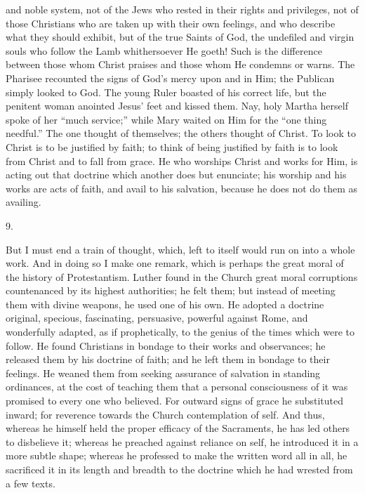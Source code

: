 and noble system, not of the Jews who rested in their rights and
privileges, not of those Christians who are taken up with their own
feelings, and who describe what they should exhibit, but of the true
Saints of God, the undefiled and virgin souls who follow the Lamb
whithersoever He goeth! Such is the difference between those whom
Christ praises and those whom He condemns or warns. The Pharisee
recounted the signs of God's mercy upon and in Him; the Publican
simply looked to God. The young Ruler boasted of his correct life, but
the penitent woman anointed Jesus' feet and kissed them. Nay, holy
Martha herself spoke of her ``much service;'' while Mary
waited on Him for the ``one thing needful.'' The one thought
of themselves; the others thought of Christ. To look to Christ is to
be justified by faith; to think of being justified by faith is to look
from Christ and to fall from grace. He who worships Christ and works
for Him, is acting out that doctrine which another does but enunciate;
his worship and his works are acts of faith, and avail to his
salvation, because he does not do them as availing.

9.

But I must end a train of thought, which, left to itself would run
on into a whole work. And in doing so I make one remark, which is
perhaps the great moral of the history of Protestantism. Luther found
in the Church great moral corruptions countenanced by its
highest authorities; he felt them; but instead of meeting them with
divine weapons, he used one of his own. He adopted a doctrine
original, specious, fascinating, persuasive, powerful against Rome,
and wonderfully adapted, as if prophetically, to the genius of the
times which were to follow. He found Christians in bondage to their
works and observances; he released them by his doctrine of faith; and
he left them in bondage to their feelings. He weaned them from seeking
assurance of salvation in standing ordinances, at the cost of teaching
them that a personal consciousness of it was promised to every one who
believed. For outward signs of grace he substituted inward; for
reverence towards the Church contemplation of self. And thus, whereas
he himself held the proper efficacy of the Sacraments, he has led
others to disbelieve it; whereas he preached against reliance on self,
he introduced it in a more subtle shape; whereas he professed to make
the written word all in all, he sacrificed it in its length and
breadth to the doctrine which he had wrested from a few texts.

